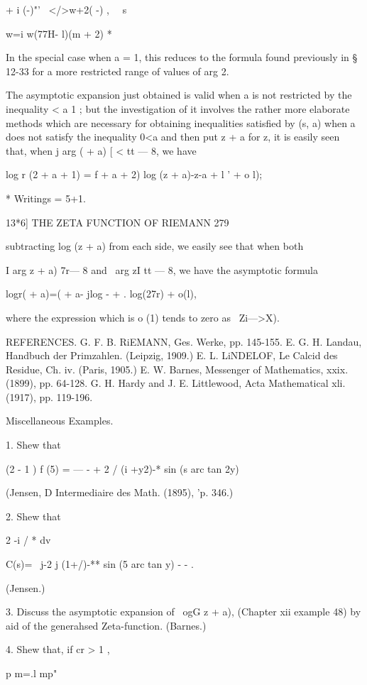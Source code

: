 {{+ i (-)"'~ </>w+2( -) , \ \ s

w=i w(77H- l)(m + 2) *

In the special case when a = 1, this reduces to the formula found
previously in § 12-33 for a more restricted range of values of arg 2.

The asymptotic expansion just obtained is valid when a is not
restricted by the inequality < a 1 ; but the investigation of it
involves the rather more elaborate methods which are necessary for
obtaining inequalities satisfied by (s, a) when a does not satisfy the
inequality 0<a%
and then put z + a for z, it is easily seen that, when j arg ( + a) [
< tt — 8, we have

log r (2 + a + 1) = f + a + 2) log (z + a)-z-a + l ' + o l);

* Writings = 5+1.

13*6] THE ZETA FUNCTION OF RIEMANN 279

subtracting log (z + a) from each side, we easily see that when both

I arg z + a) 7r— 8 and \ arg zI tt — 8, we have the asymptotic formula

logr( + a)=( + a- jlog - + . log(27r) + o(l),

where the expression which is o (1) tends to zero as \ Zi—>X).

REFERENCES. G. F. B. RiEMANN, Ges. Werke, pp. 145-155. E. G. H.
Landau, Handbuch der Primzahlen. (Leipzig, 1909.) E. L. LiNDELOF, Le
Calcid des Residue, Ch. iv. (Paris, 1905.) E. W. Barnes, Messenger of
Mathematics, xxix. (1899), pp. 64-128. G. H. Hardy and J. E.
Littlewood, Acta Mathematical xli. (1917), pp. 119-196.

Miscellaneous Examples.

1. Shew that

(2 - 1 ) f (5) = — - + 2 / (i +y2)-* sin (s arc tan 2y)

(Jensen, D Intermediaire des Math. (1895), 'p. 346.)

2. Shew that

2 -i / * dv

C(s)= \ j-2 j (1+/)-** sin (5 arc tan y) - - .

(Jensen.)

3. Discuss the asymptotic expansion of \ ogG z + a), (Chapter xii
example 48) by aid of the generahsed Zeta-function. (Barnes.)

4. Shew that, if cr > 1 ,

p m=.l mp"

}}
